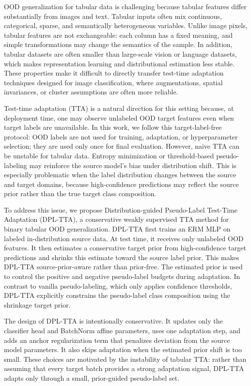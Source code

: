 OOD generalization for tabular data is challenging because tabular features differ substantially from images and text. Tabular inputs often mix continuous, categorical, sparse, and semantically heterogeneous variables. Unlike image pixels, tabular features are not exchangeable: each column has a fixed meaning, and simple transformations may change the semantics of the sample. In addition, tabular datasets are often smaller than large-scale vision or language datasets, which makes representation learning and distributional estimation less stable. These properties make it difficult to directly transfer test-time adaptation techniques designed for image classification, where augmentations, spatial invariances, or cluster assumptions are often more reliable.

Test-time adaptation (TTA) is a natural direction for this setting because, at deployment time, one may observe unlabeled OOD target features even when target labels are unavailable. In this work, we follow this target-label-free protocol: OOD labels are not used for training, adaptation, or hyperparameter selection; they are used only once for final evaluation. However, naive TTA can be unstable for tabular data. Entropy minimization or threshold-based pseudo-labeling may reinforce the source model's bias under distribution shift. This is especially problematic when the label distribution changes between the source and target domains, because high-confidence predictions may reflect the source prior rather than the true target class composition.

To address this issue, we propose Distribution-guided Pseudo-Label Test-Time Adaptation (DPL-TTA), a conservative weakly supervised TTA method for binary tabular OOD generalization. DPL-TTA first trains an ERM MLP on labeled in-distribution source data. At test time, it receives only unlabeled OOD features. It then estimates a conservative target prior from high-confidence target predictions and shrinks this estimate toward the source label prior. This makes DPL-TTA source-prior-aware rather than prior-free. The estimated prior is used to control the positive and negative pseudo-label budgets during adaptation. In contrast to vanilla pseudo-labeling, which only applies confidence thresholds, DPL-TTA explicitly constrains the pseudo-label class composition using the shrinkage target prior.

The design of DPL-TTA is intentionally conservative. It updates only the classifier head and BatchNorm affine parameters, uses one adaptation step, and adds an anchor regularization term that penalizes deviation from the source model parameters. It also skips adaptation when the estimated prior shift is too small. These choices are motivated by the instability of tabular TTA: rather than assuming that every target batch provides a strong adaptation signal, DPL-TTA adapts only through a small, prior-guided pseudo-label set.

